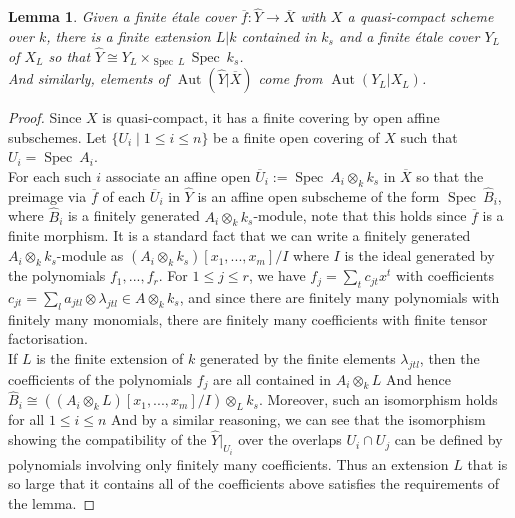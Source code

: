 \documentclass{article}
\theoremstyle{plain}
\newtheorem{lemma}[theorem]{Lemma}
\theoremstyle{definition}
\DeclareMathOperator{\Aut}{Aut}
\DeclareMathOperator{\Spec}{Spec}
\begin{document}
\begin{lemma}
\label{etale_cover_closure_come_from_extension}
    Given a finite \'etale cover $\overline{f}:\hat{Y}\rightarrow \overline{X}$ with $X$ a quasi-compact scheme over $k$, 
    there is a finite extension $L|k$ contained in $k_s$ and a finite \'etale cover $Y_L$ of $X_L$ so that $\hat{Y} \cong Y_L\times_{\Spec\:L}\Spec\:k_s$.\\
    And similarly, elements of $\Aut(\hat{Y}|\overline{X})$ come from $\Aut(Y_L|X_L)$.
\end{lemma} 
\begin{proof}
    Since $X$ is quasi-compact, it has a finite covering by open affine subschemes.
    Let $\{U_i\mid 1\leq i\leq n\}$ be a finite open covering of $X$ such that $U_i=\Spec\:A_i$. \\
    For each such $i$ associate an affine open $\overline{U}_i:= \Spec\:A_i\otimes_kk_s$
    in $\overline{X}$ so that the preimage via $\overline{f}$ of each $\overline{U}_i$ in $\hat{Y}$ is an affine open subscheme of the form $\Spec\:\hat{B}_i$, where $\hat{B}_i$ is a finitely generated $A_i\otimes_kk_s$-module, note that this holds since $\overline{f}$ is a finite morphism.
    It is a standard fact that we can write a finitely generated $A_i\otimes_kk_s$-module as $(A_i\otimes_kk_s)[x_1,...,x_m]/I$ where $I$ is the ideal generated by the polynomials $f_1,...,f_r$.
    For $1\leq j \leq r$, we have $f_j =\sum_t c_{jt}x^t$ with coefficients $c_{jt} = \sum_la_{jtl}\otimes\lambda_{jtl}\in A\otimes_kk_s$, and since there are finitely many polynomials with finitely many monomials, there are finitely many coefficients with finite tensor factorisation.\\
    If $L$ is the finite extension of $k$ generated by the finite elements $\lambda_{jtl}$, then the coefficients of the polynomials $f_j$ are all contained in $A_i\otimes_k L$
    And hence $\hat{B}_i \cong (( A_i\otimes_kL)[x_1,...,x_m]/I)\otimes_L k_s$.
    Moreover, such an isomorphism holds for all $1\leq i\leq n$
    And by a similar reasoning, we can see that the isomorphism showing the compatibility of the $\hat{Y}\vert_{U_i}$ over the overlaps $U_i\cap U_j$ can be defined by polynomials involving only finitely many coefficients.
    Thus an extension $L$ that is so large that it contains all of the coefficients above satisfies the requirements of the lemma.
\end{proof}
\end{document}
